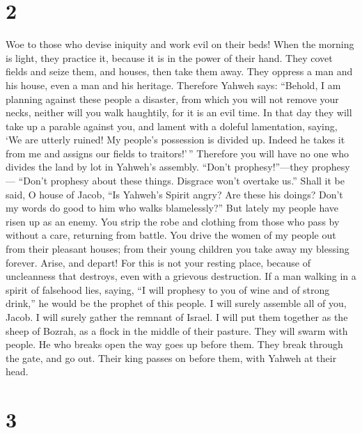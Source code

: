 \hypertarget{section-1}{%
\section{2}\label{section-1}}

 Woe to those who devise iniquity and work evil on their
beds! When the morning is light, they practice it, because it is in the
power of their hand.  They covet fields and seize them,
and houses, then take them away. They oppress a man and his house, even
a man and his heritage.  Therefore Yahweh says: ``Behold,
I am planning against these people a disaster, from which you will not
remove your necks, neither will you walk haughtily, for it is an evil
time.  In that day they will take up a parable against
you, and lament with a doleful lamentation, saying, `We are utterly
ruined! My people's possession is divided up. Indeed he takes it from me
and assigns our fields to traitors!'\,''  Therefore you
will have no one who divides the land by lot in Yahweh's assembly.
 ``Don't prophesy!''---they prophesy--- ``Don't prophesy
about these things. Disgrace won't overtake us.''  Shall
it be said, O house of Jacob, ``Is Yahweh's Spirit angry? Are these his
doings? Don't my words do good to him who walks blamelessly?''
 But lately my people have risen up as an enemy. You strip
the robe and clothing from those who pass by without a care, returning
from battle.  You drive the women of my people out from
their pleasant houses; from their young children you take away my
blessing forever.  Arise, and depart! For this is not
your resting place, because of uncleanness that destroys, even with a
grievous destruction.  If a man walking in a spirit of
falsehood lies, saying, ``I will prophesy to you of wine and of strong
drink,'' he would be the prophet of this people.  I will
surely assemble all of you, Jacob. I will surely gather the remnant of
Israel. I will put them together as the sheep of Bozrah, as a flock in
the middle of their pasture. They will swarm with people.
 He who breaks open the way goes up before them. They
break through the gate, and go out. Their king passes on before them,
with Yahweh at their head.

\hypertarget{section-2}{%
\section{3}\label{section-2}}

